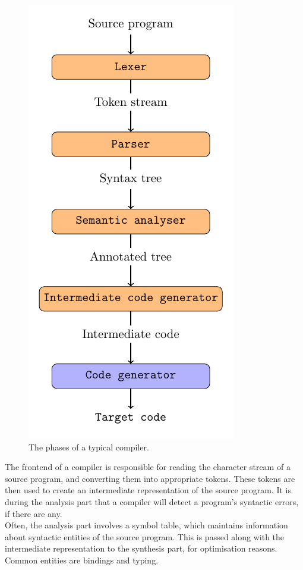 \begin{figure}[ht]
    \centering
    \includegraphics[scale=0.7]{assets/chapter2/PhasesOfCompiler.pdf}
    \caption{The phases of a typical compiler.}
    \label{compilerPhases}
\end{figure}

The frontend of a compiler is responsible for reading the character stream of a source program, and converting them into appropriate tokens. These tokens are then used to create an intermediate representation of the source program. It is during the analysis part that a compiler will detect a program's syntactic errors, if there are any. \\

Often, the analysis part involves a symbol table, which maintains information about syntactic entities of the source program. This is passed along with the intermediate representation to the synthesis part, for optimisation reasons. Common entities are bindings and typing. \\

